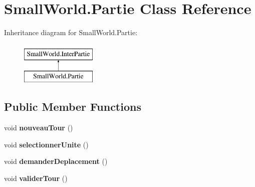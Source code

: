 \hypertarget{class_small_world_1_1_partie}{\section{Small\-World.\-Partie Class Reference}
\label{class_small_world_1_1_partie}
}
Inheritance diagram for Small\-World.\-Partie\-:\begin{figure}[H]
\begin{center}
\leavevmode
\includegraphics[height=2.000000cm]{class_small_world_1_1_partie}
\end{center}
\end{figure}
\subsection*{Public Member Functions}
\begin{DoxyCompactItemize}
\item 
\hypertarget{class_small_world_1_1_partie_a6123fa8d79551c91a92c7832649225b9}{void {\bfseries nouveau\-Tour} ()}\label{class_small_world_1_1_partie_a6123fa8d79551c91a92c7832649225b9}

\item 
\hypertarget{class_small_world_1_1_partie_aa76d3d1509ecdcb35fed3621455bab9f}{void {\bfseries selectionner\-Unite} ()}\label{class_small_world_1_1_partie_aa76d3d1509ecdcb35fed3621455bab9f}

\item 
\hypertarget{class_small_world_1_1_partie_abc458c09d880b2b16502bfe695439195}{void {\bfseries demander\-Deplacement} ()}\label{class_small_world_1_1_partie_abc458c09d880b2b16502bfe695439195}

\item 
\hypertarget{class_small_world_1_1_partie_a7ddc97d7833d234e06f18f0a97c6c15e}{void {\bfseries valider\-Tour} ()}\label{class_small_world_1_1_partie_a7ddc97d7833d234e06f18f0a97c6c15e}

\end{DoxyCompactItemize}
